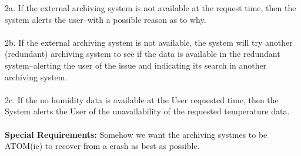 \documentclass[letterpaper]{article}
\begin{document}
2a.  If the external archiving system is not available at the request
time, then the system alerts the user--with a possible reason as to
why.\\\\
2b.  If the external archiving system is not available, the system
will try another (redundant) archiving system to see if the data is
available in the redundant system--alerting the user of the issue and
indicating its search in another archiving system.\\\\
2c.  If the no humidity data is available at the User requested
time, then the System alerts the User of the unavailability of the
requested temperature data.\\\\
\textbf{Special Requirements:  }Somehow we want the archiving systmes
to be ATOM(ic) to recover from a crash as best as possible.\\\\
\end{document}
